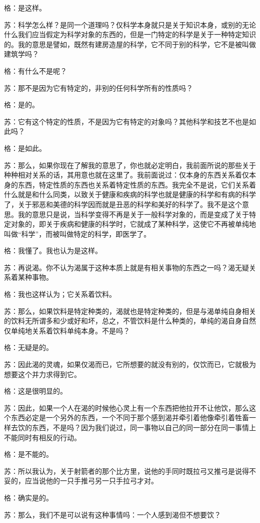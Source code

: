 \documentclass[12pt,oneside]{book}
\begin{document}
格：是这样。

苏：科学怎么样？是同一个道理吗？仅科学本身就只是关于知识本身，或别的无论什么我们应当假定为科学对象的东西的，但是一门特定的科学是关于一种特定知识的。我的意思是譬如，既然有建房造屋的科学，它不同于别的科学，它不是被叫做建筑学吗？

格：有什么不是呢？

苏：那不是因为它有特定的，非别的任何科学所有的性质吗？

格：是的。

苏：它有这个特定的性质，不是因为它有特定的对象吗？其他科学和技艺不也是如此吗？

格：是如此。

苏：那么，如果你现在了解我的意思了，你也就必定明白，我前面所说的那些关于种种相对关系的话，其用意也就在这里了。我前面说过：仅本身的东西关系着仅本身的东西，特定性质的东西也关系着特定性质的东西。我完全不是说，它们关系着什么就是和什么同类，以致关于健康和疾病的科学也就是健康的科学和有病的科学了，关于邪恶和美德的科学因而就是丑恶的科学和美好的科学了。我不是这个意思。我的意思只是说，当科学变得不再是关于一般科学对象的，而是变成了关于特定对象的，即关于疾病和健康的科学时，它就成了某种科学，这使它不再被单纯地叫做“科学”，而被叫做特定的科学，即医学了。

格：我懂了。我也认为是这样。

苏：再说渴。你不认为渴属于这种本质上就是有相关事物的东西之一吗？渴无疑关系着某种事物。

格：我也这样认为；它关系着饮料。

苏：那么，如果饮料是特定种类的，渴就也是特定种类的，但是与渴单纯自身相关的饮料无所谓多和少或好和坏，总之，不管饮料是什么种类的，单纯的渴自身自然仅单纯地关系着饮料单纯本身。不是吗？

格：无疑是的。

苏：因此渴的灵魂，如果仅渴而已，它所想要的就没有别的，仅饮而已，它就极为想要这个并力求得到它。

格：这是很明显的。

苏：因此，如果一个人在渴的时候他心灵上有一个东西把他拉开不让他饮，那么这个东西必定是一个另外的东西，一个不同于那个感到渴并牵引着他像牵引着牲畜一样去饮的东西，不是吗？因为我们说过，同一事物以自己的同一部分在同一事情上不能同时有相反的行动。

格：是不能的。

苏：所以我认为，关于射箭者的那个比方里，说他的手同时既拉弓又推弓是说得不妥的，应当说他的一只手推弓另一只手拉弓才对。

格：确实是的。

苏：那么，我们不是可以说有这种事情吗：一个人感到渴但不想要饮？
\end{document}
